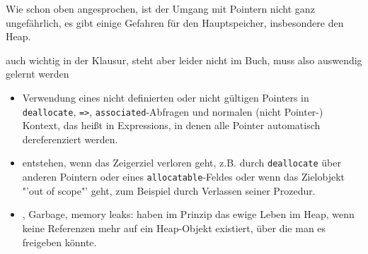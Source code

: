Wie schon oben angesprochen, ist der Umgang mit Pointern nicht ganz ungefährlich, es gibt einige Gefahren für den Hauptspeicher, insbesondere den Heap.

\begin{*anmerkung}
	auch wichtig in der Klausur, steht aber leider nicht im Buch, muss also auswendig gelernt werden
\end{*anmerkung}

\begin{itemize}
	\item Verwendung eines nicht definierten oder nicht gültigen Pointers in \texttt{deallocate}, \texttt{=>}, \texttt{associated}-Abfragen und normalen (nicht Pointer-) Kontext, das heißt in Expressions, in denen alle Pointer automatisch dereferenziert werden.
	\item {} entstehen, wenn das Zeigerziel verloren geht, z.B. durch \texttt{deallocate} über anderen Pointern oder eines \texttt{allocatable}-Feldes oder wenn das Zielobjekt "'out of scope"' geht, zum Beispiel durch Verlassen seiner Prozedur.
	\item {}, Garbage, memory leaks: haben im Prinzip das ewige Leben im Heap, wenn keine Referenzen mehr auf ein Heap-Objekt existiert, über die man es freigeben könnte.
\end{itemize}